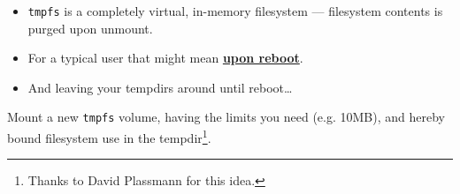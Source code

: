 \begin{frame}


\begin{itemize}

\item \texttt{tmpfs} is a completely virtual, in-memory filesystem ---
filesystem contents is purged upon unmount.

\end{itemize}

\pause

\vspace{\fill}


\begin{itemize}

\item For a typical user that might mean \underline{\textbf{upon reboot}}.

\item And leaving your tempdirs around until reboot\ldots

\end{itemize}

\end{frame}


\begin{frame}


\begin{center}

Mount a new \texttt{tmpfs} volume, having the limits you need (e.g. 10MB), and
hereby bound filesystem use in the tempdir\footnote{Thanks to David Plassmann
for this idea.}.

\end{center}

\end{frame}


\begin{frame}


\end{frame}
